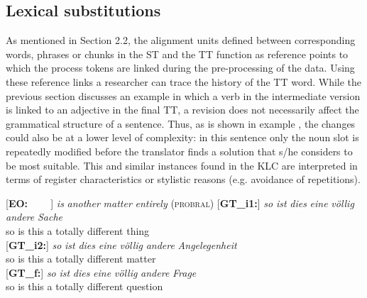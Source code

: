 \documentclass[output=paper]{LSP/langsci}
\begin{document}
\subsection{Lexical substitutions}
As mentioned in Section 2.2, the alignment units defined between corresponding words, phrases or chunks in the ST and the TT function as reference points to which the process tokens are linked during the pre-processing of the data. Using these reference links a researcher can trace the history of the TT word. While the previous section discusses an example in which a verb in the intermediate version is linked to an adjective in the final TT, a revision does not necessarily affect the grammatical structure of a sentence. Thus, as is shown in example , the changes could also be at a lower level of complexity: in this sentence only the noun slot is repeatedly modified before the translator finds a solution that s/he considers to be most suitable. This and similar instances found in the KLC are interpreted in terms of register characteristics or stylistic reasons (e.g. avoidance of repetitions).

\ea \label{ex:1:10}
\begin{xlist}
\exi{}[\textbf{EO:~~~~}]{ \emph{is} \emph{another} \emph{matter} \emph{entirely} (\textsc{probral})}
\exi{}[\textbf{GT\_i1:}]{
\gll   \emph{so} \emph{ist} \emph{dies} \emph{eine} \emph{völlig} \emph{andere} \emph{Sache}\\
 so is this a totally different thing\\
 }
 \exi{}[\textbf{GT\_i2:}]{
\gll \emph{so} \emph{ist} \emph{dies} \emph{eine} \emph{völlig} \emph{andere} \emph{Angelegenheit} \\
 so is this a totally different matter\\
 }
 \exi{}[\textbf{GT\_f:}]{
\gll \emph{so} \emph{ist} \emph{dies} \emph{eine} \emph{völlig} \emph{andere} \emph{Frage} \\
 so is this a totally different question\\
 }
\end{xlist}
\z
\end{document}
